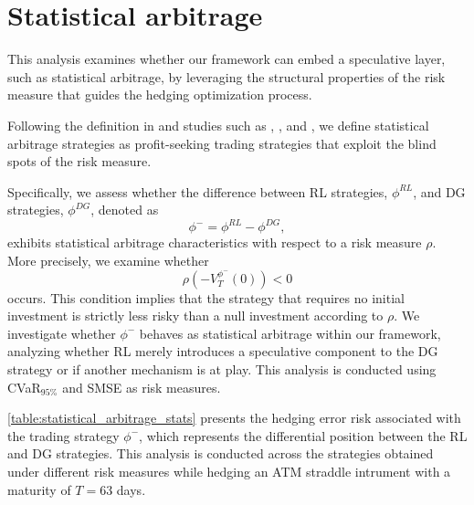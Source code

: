 \documentclass[12pt]{article}
\begin{document}
\section{Statistical arbitrage}\label{appen:statistical_arbitarge}

This analysis examines whether our framework can embed a speculative layer, such as statistical arbitrage, by leveraging the structural properties of the risk measure that guides the hedging optimization process.

Following the definition in \cite{assa2013hedging} and studies such as \cite{buehler2021deep}, \cite{horikawa2024relationship}, and \cite{François2025_stat_arbitrage}, we define statistical arbitrage strategies as profit-seeking trading strategies that exploit the blind spots of the risk measure.

Specifically, we assess whether the difference between RL strategies, $\phi^{RL}$, and DG strategies, $\phi^{DG}$, denoted as  
\begin{equation*}
    \phi^{-} = \phi^{RL} - \phi^{DG},
\end{equation*}
exhibits statistical arbitrage characteristics with respect to a risk measure $\rho$. More precisely, we examine whether  
\begin{equation*}
    \rho\left(-V_{T}^{\phi^{-}}(0)\right) < 0
\end{equation*}  
occurs. This condition implies that the strategy that requires no initial investment is strictly less risky than a null investment according to $\rho$. We investigate whether $\phi^{-}$ behaves as statistical arbitrage within our framework, analyzing whether RL merely introduces a speculative component to the DG strategy or if another mechanism is at play. This analysis is conducted using CVaR$_{95\%}$ and SMSE as risk measures.


\autoref{table:statistical_arbitrage_stats} presents the hedging error risk associated with the trading strategy $\phi^{-}$, which represents the differential position between the RL and DG strategies. This analysis is conducted across the strategies obtained under different risk measures while hedging an ATM straddle intrument with a maturity of $T=63$ days. 
\end{document}
